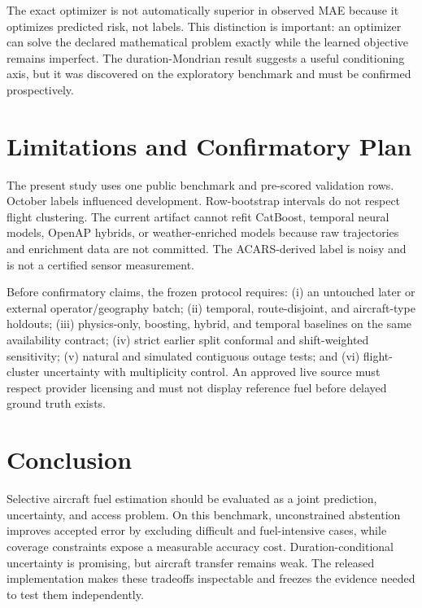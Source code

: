 \documentclass[11pt]{article}
\begin{document}
The exact optimizer is not automatically superior in observed MAE because it optimizes predicted risk, not labels. This distinction is important: an optimizer can solve the declared mathematical problem exactly while the learned objective remains imperfect. The duration-Mondrian result suggests a useful conditioning axis, but it was discovered on the exploratory benchmark and must be confirmed prospectively.

\section{Limitations and Confirmatory Plan}
The present study uses one public benchmark and pre-scored validation rows. October labels influenced development. Row-bootstrap intervals do not respect flight clustering. The current artifact cannot refit CatBoost, temporal neural models, OpenAP hybrids, or weather-enriched models because raw trajectories and enrichment data are not committed. The ACARS-derived label is noisy and is not a certified sensor measurement.

Before confirmatory claims, the frozen protocol requires: (i) an untouched later or external operator/geography batch; (ii) temporal, route-disjoint, and aircraft-type holdouts; (iii) physics-only, boosting, hybrid, and temporal baselines on the same availability contract; (iv) strict earlier split conformal and shift-weighted sensitivity; (v) natural and simulated contiguous outage tests; and (vi) flight-cluster uncertainty with multiplicity control. An approved live source must respect provider licensing and must not display reference fuel before delayed ground truth exists.

\section{Conclusion}
Selective aircraft fuel estimation should be evaluated as a joint prediction, uncertainty, and access problem. On this benchmark, unconstrained abstention improves accepted error by excluding difficult and fuel-intensive cases, while coverage constraints expose a measurable accuracy cost. Duration-conditional uncertainty is promising, but aircraft transfer remains weak. The released implementation makes these tradeoffs inspectable and freezes the evidence needed to test them independently.
\end{document}
